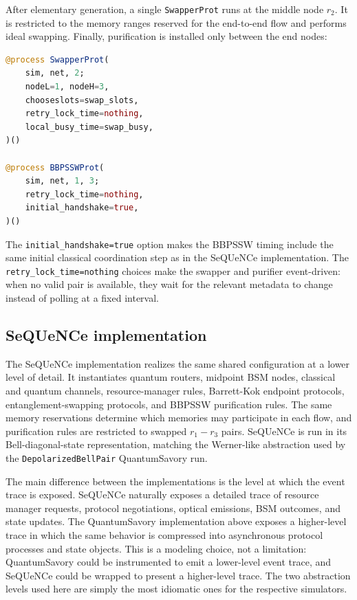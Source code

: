 After elementary generation, a single \texttt{SwapperProt} runs at the middle
node $r_2$.  It is restricted to the memory ranges reserved for the end-to-end
flow and performs ideal swapping.  Finally, purification is installed only
between the end nodes:
\begin{lstlisting}[language=Julia]
@process SwapperProt(
    sim, net, 2;
    nodeL=1, nodeH=3,
    chooseslots=swap_slots,
    retry_lock_time=nothing,
    local_busy_time=swap_busy,
)()

@process BBPSSWProt(
    sim, net, 1, 3;
    retry_lock_time=nothing,
    initial_handshake=true,
)()
\end{lstlisting}
The \texttt{initial\_handshake=true} option makes the BBPSSW timing include the
same initial classical coordination step as in the SeQUeNCe implementation.
The \texttt{retry\_lock\_time=nothing} choices make the swapper and purifier
event-driven: when no valid pair is available, they wait for the relevant
metadata to change instead of polling at a fixed interval.

\subsection{SeQUeNCe implementation}

The SeQUeNCe implementation realizes the same shared configuration at a lower
level of detail.  It instantiates quantum routers, midpoint BSM nodes,
classical and quantum channels, resource-manager rules, Barrett-Kok endpoint
protocols, entanglement-swapping protocols, and BBPSSW purification rules.  The
same memory reservations determine which memories may participate in each flow,
and purification rules are restricted to swapped $r_1-r_3$ pairs.  SeQUeNCe is
run in its Bell-diagonal-state representation, matching the Werner-like
abstraction used by the \texttt{DepolarizedBellPair} QuantumSavory run.

The main difference between the implementations is the level at which the event
trace is exposed.  SeQUeNCe naturally exposes a detailed trace of resource
manager requests, protocol negotiations, optical emissions, BSM outcomes, and
state updates.  The QuantumSavory implementation above exposes a higher-level
trace in which the same behavior is compressed into asynchronous protocol
processes and state objects.  This is a modeling choice, not a limitation:
QuantumSavory could be instrumented to emit a lower-level event trace, and
SeQUeNCe could be wrapped to present a higher-level trace.  The two
abstraction levels used here are simply the most idiomatic ones for the
respective simulators.

